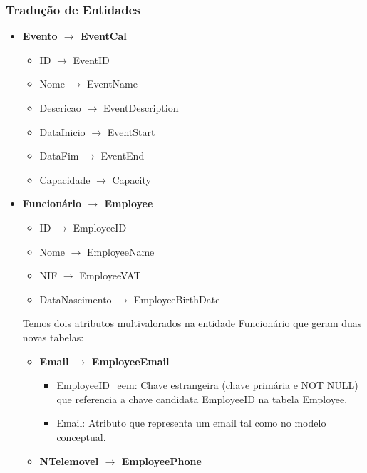 \documentclass[a4paper,12pt]{scrreprt}
\begin{document}
\subsubsection{Tradução de Entidades}
    \begin{itemize}
        \item{\textbf{Evento $\rightarrow$ EventCal}}
            \begin{itemize}
                \item{ID $\rightarrow$ EventID}
                \item{Nome $\rightarrow$ EventName}
                \item{Descricao $\rightarrow$ EventDescription}
                \item{DataInicio $\rightarrow$ EventStart}
                \item{DataFim $\rightarrow$ EventEnd}
                \item{Capacidade $\rightarrow$ Capacity}
            \end{itemize}
        \item{\textbf{Funcionário $\rightarrow$ Employee}}
            \begin{itemize}
                \item{ID $\rightarrow$ EmployeeID}
                \item{Nome $\rightarrow$ EmployeeName}
                \item{NIF $\rightarrow$ EmployeeVAT}
                \item{DataNascimento $\rightarrow$ EmployeeBirthDate}
            \end{itemize}
            Temos dois atributos multivalorados na entidade Funcionário que geram duas novas tabelas:
            \begin{itemize}
                \item{\textbf{Email $\rightarrow$ EmployeeEmail}}
                    \begin{itemize}
                        \item{EmployeeID\_eem:} Chave estrangeira (chave primária e NOT NULL) que referencia a chave candidata EmployeeID na tabela Employee.
                        \item{Email:} Atributo que representa um email tal como no modelo conceptual.
                    \end{itemize}
                \item{\textbf{NTelemovel $\rightarrow$ EmployeePhone}}
                    \begin{itemize}

\end{itemize}
\end{itemize}
\end{itemize}
\end{document}
